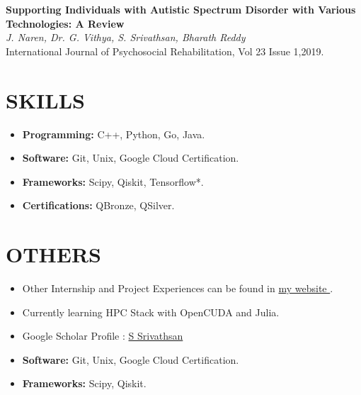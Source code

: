\documentclass[a4paper,9pt]{extarticle}
\begin{document}
\noindent
\textbf{Supporting Individuals with Autistic Spectrum Disorder with Various Technologies: A Review}\\[1pt]
\textit{J. Naren, Dr. G. Vithya, S. Srivathsan, Bharath Reddy}\\[1pt]
International Journal of Psychosocial Rehabilitation, Vol 23 Issue 1,2019.\\

\section*{SKILLS}
\begin{itemize}
    \item \textbf{Programming:} C++, Python, Go, Java.
    \item \textbf{Software:} Git, Unix, Google Cloud Certification.
    \item \textbf{Frameworks:} Scipy, Qiskit, Tensorflow*.
    \item \textbf{Certifications:} QBronze, QSilver.
\end{itemize}

\section*{OTHERS}
\begin{itemize}
    \item Other Internship and Project Experiences can be found in \href{https://www.vathzen.in/}{my website \faExternalLink}.
    \item Currently learning HPC Stack with OpenCUDA and Julia.
    \item Google Scholar Profile : \href{https://scholar.google.com/citations?user=m2CQUnsAAAAJ}{S Srivathsan \faExternalLink}
    \item \textbf{Software:} Git, Unix, Google Cloud Certification.
    \item \textbf{Frameworks:} Scipy, Qiskit.
\end{itemize}
\end{document}
